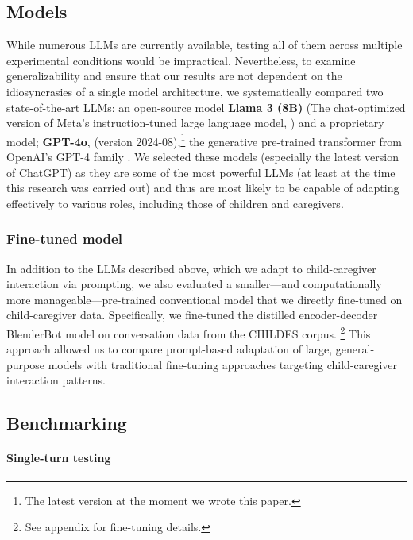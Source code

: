 \subsection{Models}  

While numerous LLMs are currently available, testing all of them across multiple experimental conditions would be impractical. Nevertheless, to examine generalizability and ensure that our results are not dependent on the idiosyncrasies of a single model architecture, we systematically compared two state-of-the-art LLMs: an open-source model \textbf{Llama 3 (8B)} (The chat-optimized version of Meta's instruction-tuned large language model, \citep{touvron2023llama}) and a proprietary model; \textbf{GPT-4o}, (version 2024-08),\footnote{The latest version at the moment we wrote this paper.} the generative pre-trained transformer from OpenAI's GPT-4 family \citep{achiam2023gpt}. We selected these models (especially the latest version of ChatGPT) as they are some of the most powerful LLMs (at least at the time this research was carried out) and thus are most likely to be capable of adapting effectively to various roles, including those of children and caregivers.

\subsubsection{Fine-tuned model}  

In addition to the LLMs described above, which we adapt to child-caregiver interaction via prompting, we also evaluated a smaller---and computationally more manageable—pre-trained conventional model that we directly fine-tuned on child-caregiver data. Specifically, we fine-tuned the distilled encoder-decoder BlenderBot model \citep{roller2020recipes} on conversation data from the CHILDES corpus. \footnote{See appendix for fine-tuning details.} This approach allowed us to compare prompt-based adaptation of large, general-purpose models with traditional fine-tuning approaches targeting child-caregiver interaction patterns.



\subsection{Benchmarking}  
\paragraph{Single-turn testing} 

